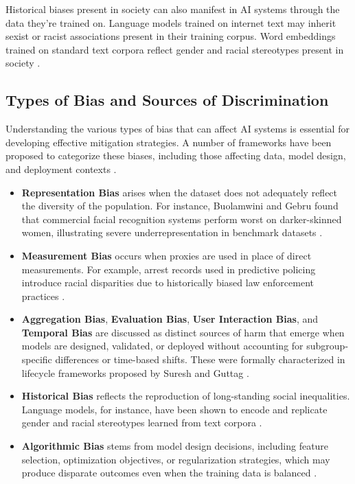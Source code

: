 \documentclass[12pt,a4paper,openright,twoside]{book}
\begin{document}
Historical biases present in society can also manifest in AI systems through the data they're trained on. Language models trained on internet text may inherit sexist or racist associations present in their training corpus. Word embeddings trained on standard text corpora reflect gender and racial stereotypes present in society \cite{caliskan2017semantics}.

\subsection{Types of Bias and Sources of Discrimination}
Understanding the various types of bias that can affect AI systems is essential for developing effective mitigation strategies. A number of frameworks have been proposed to categorize these biases, including those affecting data, model design, and deployment contexts \cite{mehrabi2021survey,suresh2021framework}.
\begin{itemize}
\item \textbf{Representation Bias} arises when the dataset does not adequately reflect the diversity of the population. For instance, Buolamwini and Gebru found that commercial facial recognition systems perform worst on darker-skinned women, illustrating severe underrepresentation in benchmark datasets \cite{buolamwini2018gender, suresh2021framework}.

\item \textbf{Measurement Bias} occurs when proxies are used in place of direct measurements. For example, arrest records used in predictive policing introduce racial disparities due to historically biased law enforcement practices \cite{ensign2018runaway, suresh2021framework}.

\item \textbf{Aggregation Bias}, \textbf{Evaluation Bias}, \textbf{User Interaction Bias}, and \textbf{Temporal Bias} are discussed as distinct sources of harm that emerge when models are designed, validated, or deployed without accounting for subgroup-specific differences or time-based shifts. These were formally characterized in lifecycle frameworks proposed by Suresh and Guttag \cite{suresh2021framework}.

\item \textbf{Historical Bias} reflects the reproduction of long-standing social inequalities. Language models, for instance, have been shown to encode and replicate gender and racial stereotypes learned from text corpora \cite{caliskan2017semantics}.

\item \textbf{Algorithmic Bias} stems from model design decisions, including feature selection, optimization objectives, or regularization strategies, which may produce disparate outcomes even when the training data is balanced \cite{mehrabi2021survey}.

\end{itemize}
\end{document}
